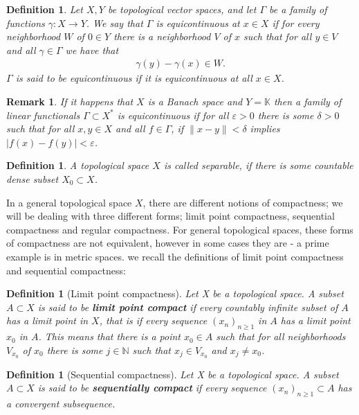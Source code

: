 \documentclass[10pt,twoside,openany,final]{memoir}
\theoremstyle{break}
\newtheorem{definition}[section]{Definition}
\theoremstyle{Break}
\newtheorem{remark}[section]{Remark}
\newcommand{\lv}{\lVert}
\newcommand{\rv}{\rVert}
\newcommand{\N}{\mathbb{N}}
\newcommand{\K}{\mathbb{K}}
\begin{document}
\begin{definition}
Let $X,Y$ be topological vector spaces, and let $\Gamma$ be a family of functions $\gamma:X \to Y$. We say that $\Gamma$ is \emph{equicontinuous} at $x \in X$ if for every neighborhood $W$ of $0\in Y$ there is a neighborhood $V$ of $x$ such that for all $y \in V$ and all $\gamma \in \Gamma$ we have that
\begin{align*}
\gamma(y) - \gamma(x) \in W.
\end{align*}
$\Gamma$ is said to be equicontinuous if it is equicontinuous at all $x \in X$.
\end{definition}

\begin{remark} \label{equicont linear func}
If it happens that $X$ is a Banach space and $Y=\K$ then a family of linear functionals $\Gamma \subset X^*$ is equicontinuous if for all $\varepsilon>0$ there is some $\delta > 0$ such that for all $x,y \in X$ and all $f \in \Gamma$, if $\lv x - y \rv < \delta$ implies $|f(x)-f(y)|<\varepsilon$.
\end{remark}

\begin{definition}
A topological space $X$ is called \emph{separable}, if there is some countable dense subset $X_{0}\subset X$. 
\end{definition}

\noindent In a general topological space $X$, there are different notions of compactness; we will be dealing with three different forms; limit point compactness, sequential compactness and regular compactness. For general topological spaces, these forms of compactness are not equivalent, however in some cases they are - a prime example is in metric spaces. we recall the definitions of limit point compactness and sequential compactness:

\begin{definition}[Limit point compactness]
Let X be a topological space. A subset $A \subset X$ is said to be \textbf{limit point compact} if every countably infinite subset of $A$ has a limit point in $X$, that is if every sequence $(x_{n})_{n\geq 1}$ in $A$ has a limit point $x_{0}$ in $A$. This means that there is a point $x_{0}\in A$ such that for all neighborhoods $V_{x_{0}}$ of $x_{0}$ there is some $j \in \N$ such that $x_{j} \in V_{x_{0}}$ and $x_{j} \neq x_{0}$. 
\end{definition}

\begin{definition}[Sequential compactness]
Let X be a topological space. A subset $A \subset X$ is said to be \textbf{sequentially compact} if every sequence $(x_{n})_{n\geq 1} \subset A$ has a convergent subsequence.
\end{definition}
\end{document}

